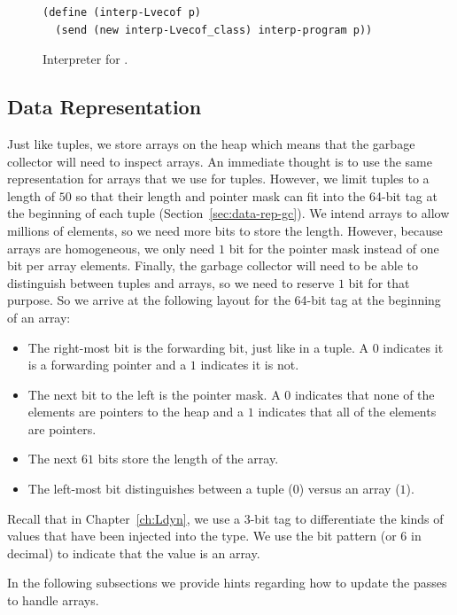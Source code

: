 \documentclass[7x10,nocrop]{TimesAPriori_MIT}%
\begin{document}
{\begin{figure}[tbp]
\begin{lstlisting}[basicstyle=\ttfamily\footnotesize]
(define (interp-Lvecof p)
  (send (new interp-Lvecof_class) interp-program p))
\end{lstlisting}
\caption{Interpreter for \LangArray{}.}
\label{fig:interp-Lvecof}
\end{figure}


\subsection{Data Representation}
\label{sec:array-rep}

Just like tuples, we store arrays on the heap which means that the
garbage collector will need to inspect arrays. An immediate thought is
to use the same representation for arrays that we use for tuples.
However, we limit tuples to a length of $50$ so that their length and
pointer mask can fit into the 64-bit tag at the beginning of each
tuple (Section~\ref{sec:data-rep-gc}). We intend arrays to allow
millions of elements, so we need more bits to store the length.
However, because arrays are homogeneous, we only need $1$ bit for the
pointer mask instead of one bit per array elements.  Finally, the
garbage collector will need to be able to distinguish between tuples
and arrays, so we need to reserve $1$ bit for that purpose.  So we
arrive at the following layout for the 64-bit tag at the beginning of
an array:
\begin{itemize}
\item The right-most bit is the forwarding bit, just like in a tuple.
  A $0$ indicates it is a forwarding pointer and a $1$ indicates
  it is not.
  
\item The next bit to the left is the pointer mask. A $0$ indicates
  that none of the elements are pointers to the heap and a $1$
  indicates that all of the elements are pointers.

\item The next $61$ bits store the length of the array.

\item The left-most bit distinguishes between a tuple ($0$) versus an
  array ($1$).
\end{itemize}


Recall that in Chapter~\ref{ch:Ldyn}, we use a $3$-bit tag to
differentiate the kinds of values that have been injected into the
 type. We use the bit pattern  (or $6$ in decimal)
to indicate that the value is an array.

In the following subsections we provide hints regarding how to update
the passes to handle arrays.


}
\end{document}
